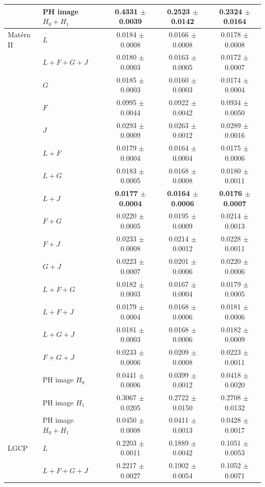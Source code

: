 \documentclass[10pt,a4paper]{article}
\newcommand{\B}[1]{\textbf{#1}}
\begin{document}
\begin{longtable}{@{}ll ccc@{}}
 & PH image $H_0{+}H_1$ & 0.4331 $\pm$ 0.0039 & 0.2523 $\pm$ 0.0142 & 0.2324 $\pm$ 0.0164\\
\midrule
Mat\'ern II & $L$ & 0.0184 $\pm$ 0.0008 & 0.0166 $\pm$ 0.0008 & 0.0178 $\pm$ 0.0008\\
 & $L{+}F{+}G{+}J$ & 0.0180 $\pm$ 0.0003 & 0.0163 $\pm$ 0.0005 & 0.0172 $\pm$ 0.0007\\
 & $G$ & 0.0185 $\pm$ 0.0003 & 0.0160 $\pm$ 0.0003 & 0.0174 $\pm$ 0.0004\\
 & $F$ & 0.0995 $\pm$ 0.0044 & 0.0922 $\pm$ 0.0042 & 0.0934 $\pm$ 0.0050\\
 & $J$ & 0.0293 $\pm$ 0.0009 & 0.0263 $\pm$ 0.0012 & 0.0289 $\pm$ 0.0016\\
 & $L{+}F$ & 0.0179 $\pm$ 0.0004 & 0.0164 $\pm$ 0.0004 & 0.0175 $\pm$ 0.0006\\
 & $L{+}G$ & 0.0183 $\pm$ 0.0005 & 0.0168 $\pm$ 0.0008 & 0.0180 $\pm$ 0.0011\\
 & \B{$L{+}J$} & \B{0.0177 $\pm$ 0.0004} & \B{0.0164 $\pm$ 0.0006} & \B{0.0176 $\pm$ 0.0007}\\
 & $F{+}G$ & 0.0220 $\pm$ 0.0005 & 0.0195 $\pm$ 0.0009 & 0.0214 $\pm$ 0.0013\\
 & $F{+}J$ & 0.0233 $\pm$ 0.0008 & 0.0214 $\pm$ 0.0012 & 0.0228 $\pm$ 0.0011\\
 & $G{+}J$ & 0.0223 $\pm$ 0.0007 & 0.0201 $\pm$ 0.0006 & 0.0220 $\pm$ 0.0006\\
 & $L{+}F{+}G$ & 0.0182 $\pm$ 0.0003 & 0.0167 $\pm$ 0.0004 & 0.0179 $\pm$ 0.0005\\
 & $L{+}F{+}J$ & 0.0179 $\pm$ 0.0004 & 0.0168 $\pm$ 0.0006 & 0.0181 $\pm$ 0.0006\\
 & $L{+}G{+}J$ & 0.0181 $\pm$ 0.0003 & 0.0168 $\pm$ 0.0006 & 0.0182 $\pm$ 0.0009\\
 & $F{+}G{+}J$ & 0.0233 $\pm$ 0.0006 & 0.0209 $\pm$ 0.0008 & 0.0223 $\pm$ 0.0011\\
 & PH image $H_0$ & 0.0441 $\pm$ 0.0006 & 0.0399 $\pm$ 0.0012 & 0.0418 $\pm$ 0.0020\\
 & PH image $H_1$ & 0.3067 $\pm$ 0.0205 & 0.2722 $\pm$ 0.0150 & 0.2708 $\pm$ 0.0132\\
 & PH image $H_0{+}H_1$ & 0.0450 $\pm$ 0.0008 & 0.0411 $\pm$ 0.0013 & 0.0428 $\pm$ 0.0017\\
\midrule
LGCP & $L$ & 0.2203 $\pm$ 0.0011 & 0.1889 $\pm$ 0.0042 & 0.1051 $\pm$ 0.0053\\
 & $L{+}F{+}G{+}J$ & 0.2217 $\pm$ 0.0027 & 0.1902 $\pm$ 0.0054 & 0.1052 $\pm$ 0.0071\\

\end{longtable}
\end{document}

